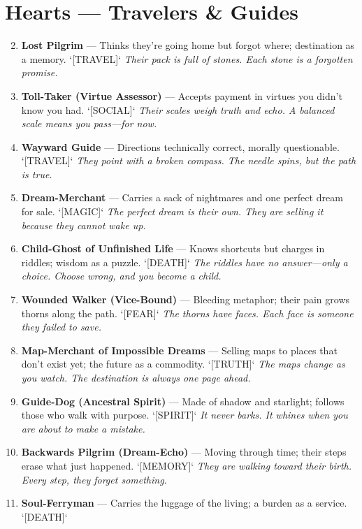 \section*{Hearts --- Travelers \& Guides}
\label{sec:ways-between-people}
\begin{enumerate}
\setcounter{enumi}{1}
\item \textbf{Lost Pilgrim} --- Thinks they're going home but forgot where; destination as a memory. `[TRAVEL]`
  \hfill \textit{Their pack is full of stones. Each stone is a forgotten promise.}
\item \textbf{Toll-Taker (Virtue Assessor)} --- Accepts payment in virtues you didn't know you had. `[SOCIAL]`
  \hfill \textit{Their scales weigh truth and echo. A balanced scale means you pass---for now.}
\item \textbf{Wayward Guide} --- Directions technically correct, morally questionable. `[TRAVEL]`
  \hfill \textit{They point with a broken compass. The needle spins, but the path is true.}
\item \textbf{Dream-Merchant} --- Carries a sack of nightmares and one perfect dream for sale. `[MAGIC]`
  \hfill \textit{The perfect dream is their own. They are selling it because they cannot wake up.}
\item \textbf{Child-Ghost of Unfinished Life} --- Knows shortcuts but charges in riddles; wisdom as a puzzle. `[DEATH]`
  \hfill \textit{The riddles have no answer---only a choice. Choose wrong, and you become a child.}
\item \textbf{Wounded Walker (Vice-Bound)} --- Bleeding metaphor; their pain grows thorns along the path. `[FEAR]`
  \hfill \textit{The thorns have faces. Each face is someone they failed to save.}
\item \textbf{Map-Merchant of Impossible Dreams} --- Selling maps to places that don't exist yet; the future as a commodity. `[TRUTH]`
  \hfill \textit{The maps change as you watch. The destination is always one page ahead.}
\item \textbf{Guide-Dog (Ancestral Spirit)} --- Made of shadow and starlight; follows those who walk with purpose. `[SPIRIT]`
  \hfill \textit{It never barks. It whines when you are about to make a mistake.}
\item \textbf{Backwards Pilgrim (Dream-Echo)} --- Moving through time; their steps erase what just happened. `[MEMORY]`
  \hfill \textit{They are walking toward their birth. Every step, they forget something.}
\item[J] \textbf{Soul-Ferryman} --- Carries the luggage of the living; a burden as a service. `[DEATH]`

\end{enumerate}
